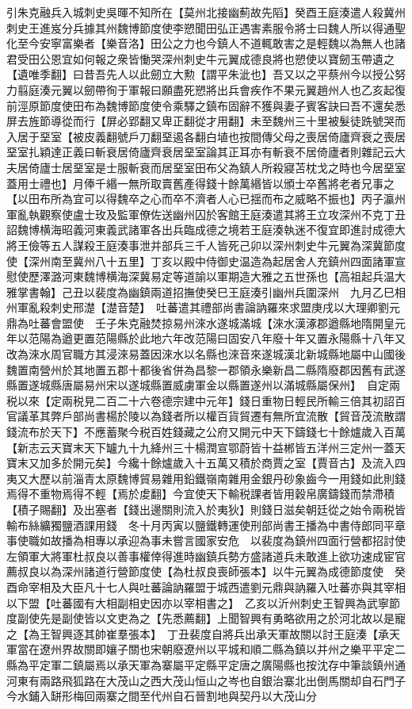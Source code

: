 引朱克融兵入城刺史吳暉不知所在【莫州北接幽薊故先䧟】癸酉王庭湊遣人殺冀州刺史王進岌分兵據其州魏博節度使李愬聞田弘正遇害素服令將士曰魏人所以得通聖化至今安寧富樂者【樂音洛】田公之力也今鎮人不道輒敢害之是輕魏以為無人也諸君受田公恩宜如何報之衆皆慟哭深州刺史牛元翼成德良將也愬使以寶劒玉帶遺之【遺唯季翻】曰昔吾先人以此劒立大勲【謂平朱泚也】吾又以之平蔡州今以授公努力翦庭湊元翼以劒帶徇于軍報曰願盡死愬將出兵會疾作不果元翼趙州人也乙亥起復前涇原節度使田布為魏博節度使令乘驛之鎮布固辭不獲與妻子賓客訣曰吾不還矣悉屏去旌節導從而行【屏必郢翻又卑正翻從才用翻】未至魏州三十里被髮徒跣號哭而入居于堊室【被皮義翻號戶刀翻堊遏各翻白埴也按間傳父母之喪居倚廬齊衰之喪居堊室扎穎達正義曰斬衰居倚廬齊衰居堊室論其正耳亦有斬衰不居倚廬者則雜記云大夫居倚廬士居堊室是士服斬衰而居堊室田布父為鎮人所殺寢苫枕戈之時也今居堊室蓋用士禮也】月俸千緡一無所取賣舊產得錢十餘萬緡皆以頒士卒舊將老者兄事之【以田布所為宜可以得魏卒之心而卒不濟者人心已揺而布之威略不振也】丙子瀛州軍亂執觀察使盧士玫及監軍僚佐送幽州囚於客館王庭湊遣其將王立攻深州不克丁丑詔魏博横海昭義河東義武諸軍各出兵臨成德之境若王庭湊執迷不復宜即進討成德大將王儉等五人謀殺王庭湊事泄并部兵三千人皆死己卯以深州刺史牛元翼為深冀節度使【深州南至冀州八十五里】丁亥以殿中侍御史温造為起居舍人充鎮州四面諸軍宣慰使歷澤潞河東魏博横海深冀易定等道諭以軍期造大雅之五世孫也【高祖起兵温大雅掌書翰】己丑以裴度為幽鎮兩道招撫使癸巳王庭湊引幽州兵圍深州　九月乙巳相州軍亂殺刺史邢濋【濋音楚】　吐蕃遣其禮部尚書論訥羅來求盟庚戌以大理卿劉元鼎為吐蕃會盟使　壬子朱克融焚掠易州淶水遂城滿城【淶水漢涿郡遒縣地隋開皇元年以范陽為遒更置范陽縣於此地六年改范陽曰固安八年廢十年又置永陽縣十八年又改為淶水周官職方其浸淶易蓋因淶水以名縣也淶音來遂城漢北新城縣地屬中山國後魏置南營州於其地置五郡十都後省併為昌黎一郡領永樂新昌二縣隋廢郡因舊有武遂縣置遂城縣唐屬易州宋以遂城縣置威虜軍金以縣置遂州以滿城縣屬保州】　自定兩税以來【定兩税見二百二十六卷德宗建中元年】錢日重物日輕民所輸三倍其初詔百官議革其弊戶部尚書楊於陵以為錢者所以權百貨貿遷有無所宜流散【貿音茂流散謂錢流布於天下】不應蓄聚今税百姓錢藏之公府又開元中天下鑄錢七十餘爐歲入百萬【新志云天寶末天下罏九十九絳州三十楊潤宣鄂蔚皆十益郴皆五洋州三定州一蓋天寶末又加多於開元矣】今纔十餘爐歲入十五萬又積於商賈之室【賈音古】及流入四夷又大歷以前淄青太原魏博貿易雜用鉛鐵嶺南雜用金銀丹砂象齒今一用錢如此則錢焉得不重物焉得不輕【焉於䖍翻】今宜使天下輸税課者皆用穀帛廣鑄錢而禁滯積【積子賜翻】及出塞者【錢出邊關則流入於夷狄】則錢日滋矣朝廷從之始令兩税皆輸布絲纊獨鹽酒課用錢　冬十月丙寅以鹽鐵轉運使刑部尚書王播為中書侍郎同平章事使職如故播為相專以承迎為事未嘗言國家安危　以裴度為鎮州四面行營都招討使左領軍大將軍杜叔良以善事權倖得進時幽鎮兵勢方盛諸道兵未敢進上欲功速成宦官薦叔良以為深州諸道行營節度使【為杜叔良喪師張本】以牛元翼為成德節度使　癸酉命宰相及大臣凡十七人與吐蕃論訥羅盟于城西遣劉元鼎與訥羅入吐蕃亦與其宰相以下盟【吐蕃國有大相副相史因亦以宰相書之】　乙亥以沂州刺史王智興為武寧節度副使先是副使皆以文吏為之【先悉薦翻】上聞智興有勇略欲用之於河北故以是寵之【為王智興逐其帥崔羣張本】　丁丑裴度自將兵出承天軍故關以討王庭湊【承天軍當在遼州界故關即孃子關也宋朝廢遼州以平城和順二縣為鎮以并州之樂平平定二縣為平定軍二鎮屬焉以承天軍為寨屬平定縣平定唐之廣陽縣也按沈存中筆談鎮州通河東有兩路飛狐路在大茂山之西大茂山恒山之岑也自銀治寨北出倒馬關却自石門子今水鋪入缾形梅回兩寨之間至代州自石晉割地與契丹以大茂山分